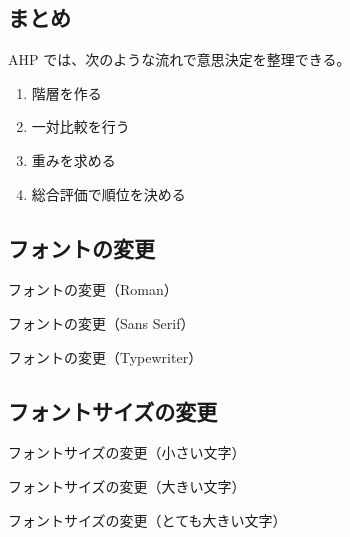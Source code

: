 \documentclass[12pt]{ltjsarticle}
\begin{document}
\subsection{まとめ}

AHP では、次のような流れで意思決定を整理できる。

\begin{enumerate}
\item 階層を作る
\item 一対比較を行う
\item 重みを求める
\item 総合評価で順位を決める
\end{enumerate}
\subsection{フォントの変更}

フォントの変更（{\rmfamily Roman}）

フォントの変更（{\sffamily Sans Serif}）

フォントの変更（{\ttfamily Typewriter}）

\subsection{フォントサイズの変更}

フォントサイズの変更（{\small 小さい文字}）

フォントサイズの変更（{\Large 大きい文字}）

フォントサイズの変更（{\Huge とても大きい文字}）
\end{document}
